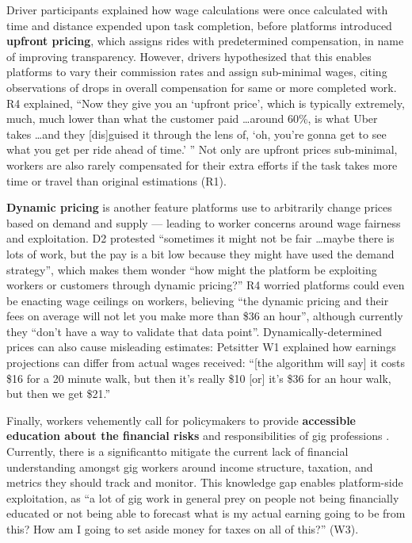 Driver participants explained {how wage calculations were once calculated with time and distance expended upon task completion, before} platforms introduced \textbf{upfront pricing}, which assigns rides with predetermined compensation, in name of improving transparency. However, drivers {hypothesized that} this enables platforms to vary their commission rates and assign sub-minimal wages, {citing observations of }drops in overall compensation for same or more completed work. R4 explained, ``Now they give you an `upfront price', which is typically extremely, much, much lower than what the customer paid  \dots  around 60\%, is what Uber takes  \dots and they [dis]guised it through the lens of, `oh, you're gonna get to see what you get per ride ahead of time.' '' Not only are upfront prices sub-minimal, {workers are also rarely compensated for their extra efforts }if the task takes more time or travel than original {estimations }(R1). 

\textbf{Dynamic pricing} is another feature platforms use to arbitrarily change prices based on demand and supply --- leading to worker concerns around wage fairness and exploitation. 
D2 protested ``sometimes it might not be fair  \dots maybe there is lots of work, but the pay is a bit low because they might have used the demand strategy'', which makes them wonder ``how might the platform be exploiting workers or customers through dynamic pricing?'' R4 worried platforms could even be enacting wage ceilings on workers, believing ``the dynamic pricing and their fees on average will not let you make more than \$36 an hour'', although currently they ``don't have a way to validate that data point''. Dynamically-determined prices can also {cause misleading estimates:} Petsitter W1 explained {how} earnings projections can differ from actual wages received: ``[the algorithm will say] it costs \$16 for a 20 minute walk, but then it's really \$10 [or] it's \$36 for an hour walk, but then we get \$21.'' 

Finally, workers vehemently call for policymakers to provide \textbf{accessible education about the financial risks} and responsibilities of gig professions . Currently, there is a significant{to mitigate the current} lack of financial {understanding} amongst gig workers around income structure, taxation, and metrics they should track and monitor. This knowledge gap enables platform-side exploitation, as ``a lot of gig work in general prey on people not being financially educated or not being able to forecast what is my actual earning going to be from this? How am I going to set aside money for taxes on all of this?'' (W3). 


